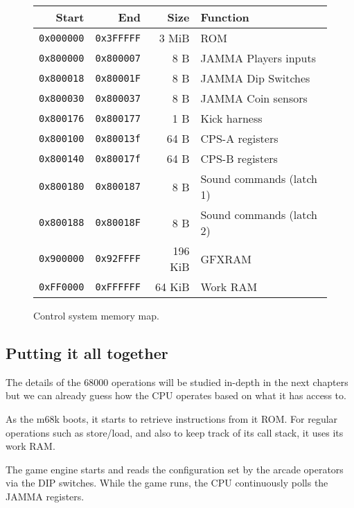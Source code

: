 \begin{figure}[H]
{
\begin{tabularx}{\textwidth}{rrrX}
  \textbf{Start } & \textbf{End  } & \textbf{Size } & \textbf{Function } \\               
  \toprule    
  \texttt{0x000000} & \texttt{0x3FFFFF} & 3 MiB & ROM \\
  \toprule    
  \texttt{0x800000} & \texttt{0x800007} & 8 B & JAMMA Players inputs \\
  \texttt{0x800018} & \texttt{0x80001F} & 8 B & JAMMA Dip Switches \\
  \texttt{0x800030} & \texttt{0x800037} & 8 B & JAMMA Coin sensors \\
  \texttt{0x800176} & \texttt{0x800177} & 1 B & Kick harness \\
\toprule    
  \texttt{0x800100} & \texttt{0x80013f} & 64 B & CPS-A registers\\
  \texttt{0x800140} & \texttt{0x80017f} & 64 B & CPS-B registers\\
\toprule    
  \texttt{0x800180} & \texttt{0x800187} & 8 B & Sound commands (latch 1)\\
  \texttt{0x800188} & \texttt{0x80018F} & 8 B & Sound commands (latch 2)\\
  \toprule    
  \texttt{0x900000} & \texttt{0x92FFFF} & 196 KiB & GFXRAM\\
  \texttt{0xFF0000} & \texttt{0xFFFFFF} & 64 KiB & Work RAM \\
\end{tabularx}%
}\caption*{Control system memory map.}
\end{figure}

\subsection{Putting it all together}

The details of the 68000 operations will be studied in-depth in the next chapters but we can already guess how the CPU operates based on what it has access to.

As the m68k boots, it starts to retrieve instructions from it ROM. For regular operations such as store/load, and also to keep track of its call stack, it uses its work RAM. 

The game engine starts and reads the configuration set by the arcade operators via the DIP switches. While the game runs, the CPU continuously polls the JAMMA registers.


